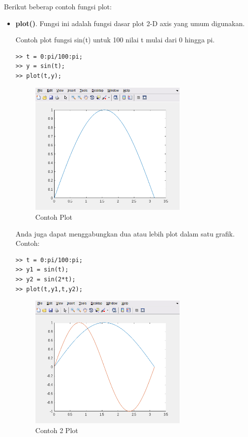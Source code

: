 \documentclass[12pt]{book}
\begin{document}
	Berikut beberap contoh fungsi plot:
	\begin{itemize}
		\item \textbf{plot()}. Fungsi ini adalah fungsi dasar plot 2-D axis yang umum digunakan.

		Contoh plot fungsi sin(t) untuk 100 nilai t mulai dari 0 hingga pi.
		\begin{verbatim}
>> t = 0:pi/100:pi;
>> y = sin(t);
>> plot(t,y);
		\end{verbatim}

		\newpage
		\begin{figure}[!ht]
			\centering
			\includegraphics[width=220pt]{images/plot1}
			\caption{Contoh Plot}
		\end{figure}

		Anda juga dapat menggabungkan dua atau lebih plot dalam satu grafik.
		Contoh:
		\begin{verbatim}
>> t = 0:pi/100:pi;
>> y1 = sin(t);
>> y2 = sin(2*t);
>> plot(t,y1,t,y2);
		\end{verbatim}

		\begin{figure}[!ht]
			\centering
			\includegraphics[width=220pt]{images/plot2}
			\caption{Contoh 2 Plot}
		\end{figure}


\end{itemize}
\end{document}
